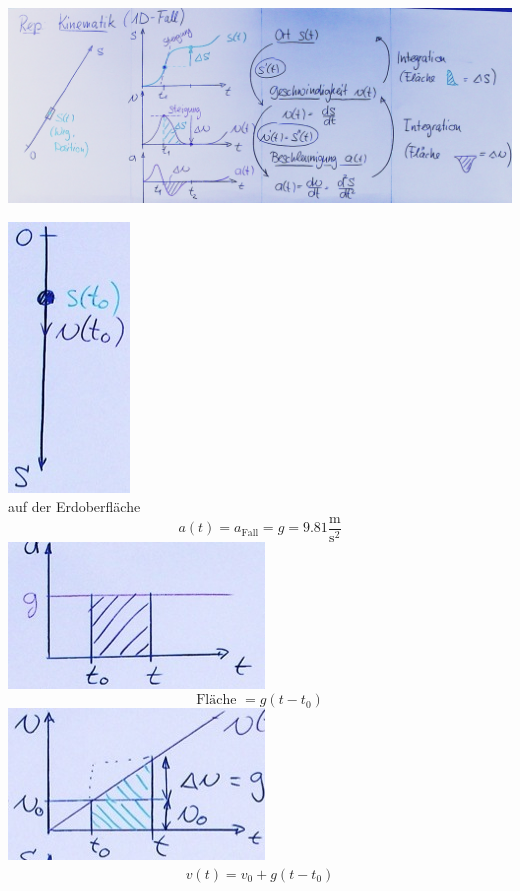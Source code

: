 \begin{rep*}[note = Kinematik (1D-Fall)]
	\includegraphics{Bild7}
\end{rep*}
\begin{bsp*}[note = Der freie Fall]
	\includegraphics{Bild8} \\
	auf der Erdoberfläche
	\[ a(t) = a_{\text{Fall}} = g = 9.81 \frac{\text{m}}{{\text{s}}^2} \]
	\includegraphics{Bild9}
	\[ \text{Fläche } = g( t - t_0 ) \]
	\includegraphics{Bild10}
	\begin{gather*}
		v(t) = v_0 + g( t - t_0 ) \\

\end{gather*}
\end{bsp*}
